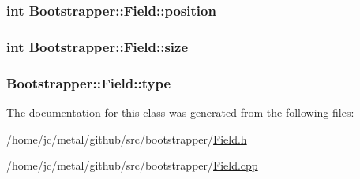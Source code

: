 \subsubsection[{position}]{\setlength{\rightskip}{0pt plus 5cm}int Bootstrapper\+::\+Field\+::position}\label{classBootstrapper_1_1Field_a0c0b21db786e8e7463906fb18466f119}
\hypertarget{classBootstrapper_1_1Field_af0d0093eaaf445b55a91f12b33174442}{}
\subsubsection[{size}]{\setlength{\rightskip}{0pt plus 5cm}int Bootstrapper\+::\+Field\+::size}\label{classBootstrapper_1_1Field_af0d0093eaaf445b55a91f12b33174442}
\hypertarget{classBootstrapper_1_1Field_a3b51be0dcd155bb84173f1a73596d963}{}
\subsubsection[{type}]{ Bootstrapper\+::\+Field\+::type}\label{classBootstrapper_1_1Field_a3b51be0dcd155bb84173f1a73596d963}


The documentation for this class was generated from the following files\+:\begin{DoxyCompactItemize}
\item 
/home/jc/metal/github/src/bootstrapper/\hyperlink{Field_8h}{Field.\+h}\item 
/home/jc/metal/github/src/bootstrapper/\hyperlink{Field_8cpp}{Field.\+cpp}\end{DoxyCompactItemize}
